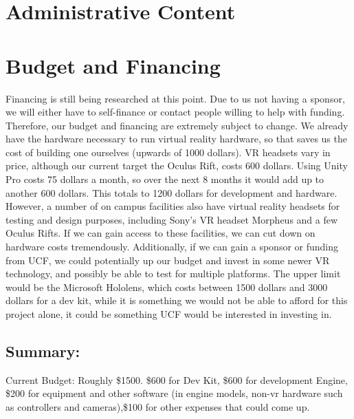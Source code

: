 \documentclass[a4paper,10pt]{article}
\begin{document}
\pagebreak

\section{Administrative Content}
\section{Budget and Financing}
			    Financing is still being researched at this point.  Due to us not having a sponsor, we will either have to self-finance or contact people willing to help with funding.  Therefore, our budget and financing are extremely subject to change. We already have the hardware necessary to run virtual reality hardware, so that saves us the cost of building one ourselves (upwards of 1000 dollars). VR headsets vary in price, although our current target the Oculus Rift, costs 600 dollars. Using Unity Pro costs 75 dollars a month, so over the next 8 months it would add up to another 600 dollars. This totals to 1200 dollars for development and hardware. However, a number of on campus facilities also have virtual 
			    reality headsets for testing and design purposes, including Sony’s VR headset Morpheus and a few Oculus Rifts.  If we can gain access to these facilities, we can cut down on hardware costs tremendously.  Additionally, if we can gain a sponsor or funding from UCF, we could potentially up our budget and invest in some newer VR 
			    technology, and possibly be able to test for multiple platforms. The upper limit would be the Microsoft Hololens, which costs between 1500 dollars and 3000 dollars for a dev kit, while it is something we would 
			    not be able to afford for this project alone, it could be something UCF would be interested in investing in.  
			    
			    \subsection{Summary:}
			    Current Budget: Roughly \$1500.  \$600 for Dev Kit,
			    \$600 for development Engine, \$200 for equipment and other software (in engine models, non-vr hardware such as controllers and cameras),\$100 for other
			    expenses that could come up.
			    
\end{document}
